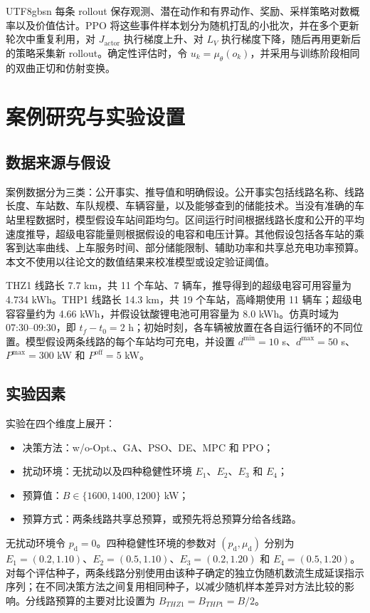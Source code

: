 \documentclass[conference]{IEEEtran}
\newcommand{\thz}{THZ1}
\newcommand{\thp}{THP1}
\begin{document}
\begin{CJK*}{UTF8}{gbsn}
每条 rollout 保存观测、潜在动作和有界动作、奖励、采样策略对数概率以及价值估计。PPO 将这些事件样本划分为随机打乱的小批次，并在多个更新轮次中重复利用，对 $J_{\mathrm{actor}}$ 执行梯度上升、对 $L_V$ 执行梯度下降，随后再用更新后的策略采集新 rollout。确定性评估时，令 $u_k=\mu_\theta(o_k)$，并采用与训练阶段相同的双曲正切和仿射变换。

\section{案例研究与实验设置}
\subsection{数据来源与假设}
案例数据分为三类：公开事实、推导值和明确假设。公开事实包括线路名称、线路长度、车站数、车队规模、车辆容量，以及能够查到的储能技术。当没有准确的车站里程数据时，模型假设车站间距均匀。区间运行时间根据线路长度和公开的平均速度推导，超级电容能量则根据假设的电容和电压计算。其他假设包括各车站的乘客到达率曲线、上车服务时间、部分储能限制、辅助功率和共享总充电功率预算。本文不使用以往论文的数值结果来校准模型或设定验证阈值。

\thz{} 线路长 7.7 km，共 11 个车站、7 辆车，推导得到的超级电容可用容量为 4.734 kWh。\thp{} 线路长 14.3 km，共 19 个车站，高峰期使用 11 辆车；超级电容容量约为 4.66 kWh，并假设钛酸锂电池可用容量为 8.0 kWh。仿真时域为 07:30--09:30，即 $t_f-t_0=2$ h；初始时刻，各车辆被放置在各自运行循环的不同位置。模型假设两条线路的每个车站均可充电，并设置 $d^{\min}=10$ s、$d^{\max}=50$ s、$P^{\max}=300$ kW 和 $P^{\mathrm{off}}=5$ kW。

\subsection{实验因素}
实验在四个维度上展开：
\begin{itemize}
    \item 决策方法：w/o-Opt.、GA、PSO、DE、MPC 和 PPO；
    \item 扰动环境：无扰动以及四种稳健性环境 $E_1$、$E_2$、$E_3$ 和 $E_4$；
    \item 预算值：$B \in \{1600,1400,1200\}$ kW；
    \item 预算方式：两条线路共享总预算，或预先将总预算分给各线路。
\end{itemize}
无扰动环境令 $p_{\mathrm d}=0$。四种稳健性环境的参数对 $(p_{\mathrm d},\mu_{\mathrm d})$ 分别为 $E_1=(0.2,1.10)$、$E_2=(0.5,1.10)$、$E_3=(0.2,1.20)$ 和 $E_4=(0.5,1.20)$。对每个评估种子，两条线路分别使用由该种子确定的独立伪随机数流生成延误指示序列；在不同决策方法之间复用相同种子，以减少随机样本差异对方法比较的影响。分线路预算的主要对比设置为 $B_{\thz}=B_{\thp}=B/2$。


\end{CJK*}
\end{document}
